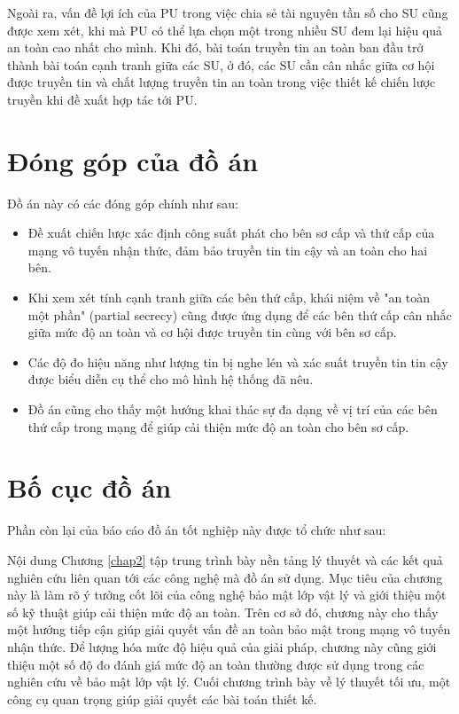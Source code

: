 \documentclass[../main.tex]{subfiles}
\begin{document}
Ngoài ra, vấn đề lợi ích của PU trong việc chia sẻ tài nguyên tần số cho SU cũng được xem xét, khi mà PU có thể lựa chọn một trong nhiều SU đem lại hiệu quả an toàn cao nhất cho mình. Khi đó, bài toán truyền tin an toàn ban đầu trở thành bài toán cạnh tranh giữa các SU, ở đó, các SU cần cân nhắc giữa cơ hội được truyền tin và chất lượng truyền tin an toàn trong việc thiết kế chiến lược truyền khi đề xuất hợp tác tới PU.

\section{Đóng góp của đồ án}

Đồ án này có các đóng góp chính như sau:

\begin{itemize}
\item Đề xuất chiến lược xác định công suất phát cho bên sơ cấp và thứ cấp của mạng vô tuyến nhận thức, đảm bảo truyền tin tin cậy và an toàn cho hai bên.
\item Khi xem xét tính cạnh tranh giữa các bên thứ cấp, khái niệm về "an toàn một phần" (partial secrecy) cũng được ứng dụng để các bên thứ cấp cân nhắc giữa mức độ an toàn và cơ hội được truyền tin cùng với bên sơ cấp.
\item Các độ đo hiệu năng như lượng tin bị nghe lén và xác suất truyền tin tin cậy được biểu diễn cụ thể cho mô hình hệ thống đã nêu.
\item Đồ án cũng cho thấy một hướng khai thác sự đa dạng về vị trí của các bên thứ cấp trong mạng để giúp cải thiện mức độ an toàn cho bên sơ cấp.
\end{itemize}

\section{Bố cục đồ án}

Phần còn lại của báo cáo đồ án tốt nghiệp này được tổ chức như sau:

Nội dung Chương \ref{chap2} tập trung trình bày nền tảng lý thuyết và các kết quả nghiên cứu liên quan tới các công nghệ mà đồ án sử dụng. Mục tiêu của chương này là làm rõ ý tưởng cốt lõi của công nghệ bảo mật lớp vật lý và giới thiệu một số kỹ thuật giúp cải thiện mức độ an toàn. Trên cơ sở đó, chương này cho thấy một hướng tiếp cận giúp giải quyết vấn đề an toàn bảo mật trong mạng vô tuyến nhận thức. Để lượng hóa mức độ hiệu quả của giải pháp, chương này cũng giới thiệu một số độ đo đánh giá mức độ an toàn thường được sử dụng trong các nghiên cứu về bảo mật lớp vật lý. Cuối chương trình bày về lý thuyết tối ưu, một công cụ quan trọng giúp giải quyết các bài toán thiết kế.
\end{document}
